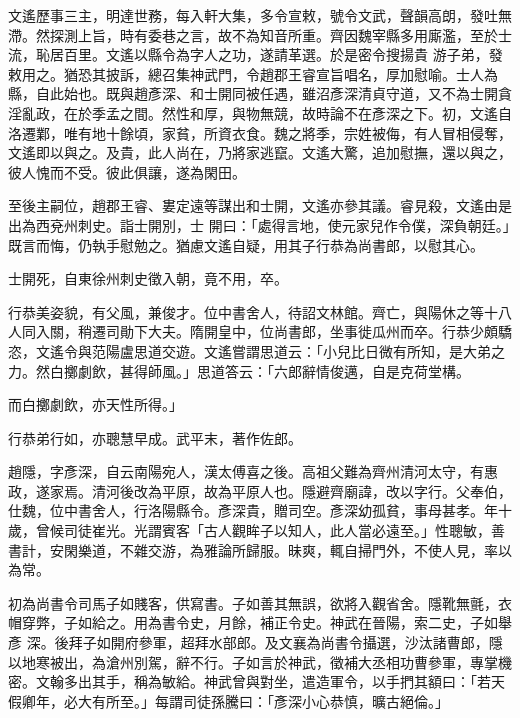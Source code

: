 \begin{pinyinscope}
 文遙歷事三主，明達世務，每入軒大集，多令宣敕，號令文武，聲韻高朗，發吐無滯。然探測上旨，時有委巷之言，故不為知音所重。齊因魏宰縣多用廝濫，至於士流，恥居百里。文遙以縣令為字人之功，遂請革選。於是密令搜揚貴
 游子弟，發敕用之。猶恐其披訴，總召集神武門，令趙郡王睿宣旨唱名，厚加慰喻。士人為縣，自此始也。既與趙彥深、和士開同被任遇，雖沼彥深清貞守道，又不為士開貪淫亂政，在於季孟之間。然性和厚，與物無競，故時論不在彥深之下。初，文遙自洛遷鄴，唯有地十餘頃，家貧，所資衣食。魏之將季，宗姓被侮，有人冒相侵奪，文遙即以與之。及貴，此人尚在，乃將家逃竄。文遙大驚，追加慰撫，還以與之，彼人愧而不受。彼此俱讓，遂為閑田。



 至後主嗣位，趙郡王睿、婁定遠等謀出和士開，文遙亦參其議。睿見殺，文遙由是出為西兗州刺史。詣士開別，士
 開曰：「處得言地，使元家兒作令僕，深負朝廷。」既言而悔，仍執手慰勉之。猶慮文遙自疑，用其子行恭為尚書郎，以慰其心。



 士開死，自東徐州刺史徵入朝，竟不用，卒。



 行恭美姿貌，有父風，兼俊才。位中書舍人，待詔文林館。齊亡，與陽休之等十八人同入關，稍遷司勛下大夫。隋開皇中，位尚書郎，坐事徙瓜州而卒。行恭少頗驕恣，文遙令與范陽盧思道交遊。文遙嘗謂思道云：「小兒比日微有所知，是大弟之力。然白擲劇飲，甚得師風。」思道答云：「六郎辭情俊邁，自是克荷堂構。



 而白擲劇飲，亦天性所得。」



 行恭弟行如，亦聰慧早成。武平末，著作佐郎。



 趙隱，字彥深，自云南陽宛人，漢太傅喜之後。高祖父難為齊州清河太守，有惠政，遂家焉。清河後改為平原，故為平原人也。隱避齊廟諱，改以字行。父奉伯，仕魏，位中書舍人，行洛陽縣令。彥深貴，贈司空。彥深幼孤貧，事母甚孝。年十歲，曾候司徒崔光。光謂賓客「古人觀眸子以知人，此人當必遠至。」性聰敏，善書計，安閑樂道，不雜交游，為雅論所歸服。昧爽，輒自掃門外，不使人見，率以為常。



 初為尚書令司馬子如賤客，供寫書。子如善其無誤，欲將入觀省舍。隱靴無氈，衣帽穿弊，子如給之。用為書令史，月餘，補正令史。神武在晉陽，索二史，子如舉彥
 深。後拜子如開府參軍，超拜水部郎。及文襄為尚書令攝選，沙汰諸曹郎，隱以地寒被出，為滄州別駕，辭不行。子如言於神武，徵補大丞相功曹參軍，專掌機密。文翰多出其手，稱為敏給。神武曾與對坐，遣造軍令，以手捫其額曰：「若天假卿年，必大有所至。」每謂司徒孫騰曰：「彥深小心恭慎，曠古絕倫。」




\end{pinyinscope}
